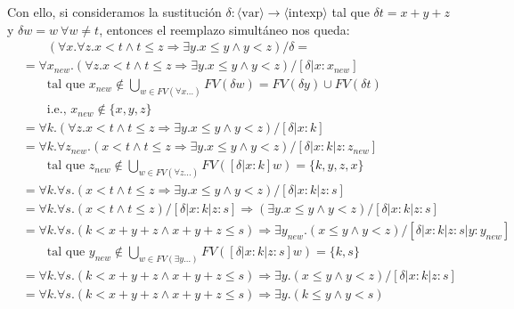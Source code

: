 \documentclass{article}
\newcommand{\aexp}[1]{\langle\text{#1}\rangle}
\newcommand{\intexp}{\aexp{intexp}}
\newcommand{\var}{\aexp{var}}
\begin{document}
Con ello, si consideramos la sustitución $\delta : \var \to \intexp$ tal que $\delta t = x + y + z$ y $\delta w = w\ \forall w \neq t$, entonces el reemplazo simultáneo nos queda:
\begin{equation*}
	\begin{aligned}
		 & \qquad (\forall x. \forall z. x < t \land t \leq z \Rightarrow \exists y. x \leq y \land y < z)/\delta =                                                  \\
		 & = \forall x_{new}. (\forall z. x < t \land t \leq z \Rightarrow \exists y. x \leq y \land y < z)/[\delta | x : x_{new}]                                   \\
		 & \qquad \text{tal que } x_{new} \notin \bigcup_{w \in FV(\forall x \dots)} FV(\delta w) = FV(\delta y) \cup FV(\delta t)                                   \\
		 & \qquad \text{i.e., } x_{new} \notin \{x, y, z\}                                                                                                           \\
		 & = \forall k. (\forall z. x < t \land t \leq z \Rightarrow \exists y. x \leq y \land y < z)/[\delta | x : k]                                               \\
		 & = \forall k. \forall z_{new}. (x < t \land t \leq z \Rightarrow \exists y. x \leq y \land y < z)/[\delta | x : k | z : z_{new}]                           \\
		 & \qquad \text{tal que } z_{new} \notin \bigcup_{w \in FV(\forall z \dots)} FV([\delta | x : k] w) = \{k, y, z, x\}                                         \\
		 & = \forall k. \forall s. (x < t \land t \leq z \Rightarrow \exists y. x \leq y \land y < z)/[\delta | x : k | z : s]                                       \\
		 & = \forall k. \forall s. (x < t \land t \leq z)/[\delta | x : k | z : s] \Rightarrow (\exists y. x \leq y \land y < z)/[\delta | x : k | z : s]            \\
		 & = \forall k. \forall s. (k < x + y + z \land x + y + z \leq s) \Rightarrow \exists y_{new}. (x \leq y \land y < z)/[\delta | x : k | z : s | y : y_{new}] \\
		 & \qquad \text{tal que } y_{new} \notin \bigcup_{w \in FV(\exists y \dots)} FV([\delta | x : k | z : s] w) = \{k, s\}                                       \\
		 & = \forall k. \forall s. (k < x + y + z \land x + y + z \leq s) \Rightarrow \exists y. (x \leq y \land y < z)/[\delta | x : k | z : s]                     \\
		 & = \forall k. \forall s. (k < x + y + z \land x + y + z \leq s) \Rightarrow \exists y. (k \leq y \land y < s)
	\end{aligned}
\end{equation*}
\end{document}
